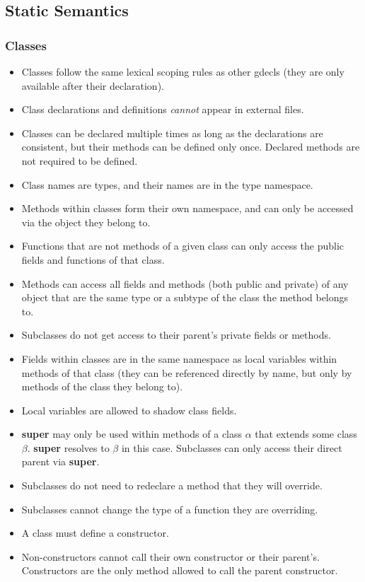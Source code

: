 \documentclass{article}
\newcommand{\term}[1]{\textbf {#1}}
\begin{document}
\subsection{Static Semantics}
\subsubsection{Classes}
\begin{itemize}
\item Classes follow the same lexical scoping rules as other gdecls (they are
      only available after their declaration).
\item Class declarations and definitions \emph{cannot} appear in external files.
\item Classes can be declared multiple times as long as the declarations are
      consistent, but their methods can be defined only once. Declared methods
      are not required to be defined.
\item Class names are types, and their names are in the type namespace.
\item Methods within classes form their own namespace, and can only be accessed
      via the object they belong to.
\item Functions that are not methods of a given class can only access the public
      fields and functions of that class.
\item Methods can access all fields and methods (both public and private) of any
      object that are the same type or a subtype of the class the method belongs to.
\item Subclasses do not get access to their parent's private fields or methods.
\item Fields within classes are in the same namespace as local variables within
      methods of that class (they can be referenced directly by name, but only
      by methods of the class they belong to).
\item Local variables are allowed to shadow class fields.
\item \term{super} may only be used within methods of a class $\alpha$ that
      extends some class $\beta$. \term{super} resolves to $\beta$ in this
      case. Subclasses can only access their direct parent via \term{super}.
\item Subclasses do not need to redeclare a method that they will override.
\item Subclasses cannot change the type of a function they are overriding.
\item A class must define a constructor.
\item Non-constructors cannot call their own constructor or their parent's.
      Constructors are the only method allowed to call the parent constructor.
\end{itemize}
\end{document}
